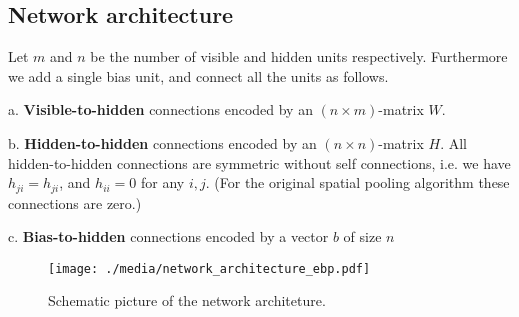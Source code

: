 \documentclass[titlepage]{amsart}
\theoremstyle{definition}
\begin{document}
\subsection{Network architecture}
% 
% 
Let $m$ and $n$ be the number of visible and hidden units respectively. 
Furthermore we add a single bias unit, and connect all the units as follows. 
\begin{list}{}{}
\item[a.] \textbf{Visible-to-hidden} connections encoded by an $(n \times m)$-matrix $W$.
\item[b.] \textbf{Hidden-to-hidden} connections encoded by an $(n \times n)$-matrix $H$. 
          All hidden-to-hidden connections are symmetric without self connections,
          i.e. we have $h_{ji} = h_{ji}$, and $h_{ii} = 0$ for any $i,j$.
          (For the original spatial pooling algorithm these connections are zero.)
\item[c.] \textbf{Bias-to-hidden} connections encoded by a vector $b$ of size $n$ 
\end{list}
% 
\begin{figure}[h]
\texttt{[image: ./media/network\_architecture\_ebp.pdf]}
\caption{Schematic picture of the network architeture.}
 \label{fig:network architecture}
\end{figure}
% 
% 
\end{document}
